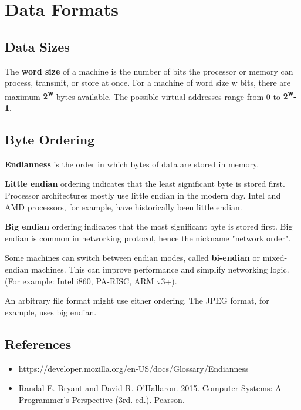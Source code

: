 \chapter{Data Formats}

\section{Data Sizes}
The \textbf{word size} of a machine is the number of bits the processor or memory can process, transmit, or store at once. For a machine of word size w bits, there are maximum \textbf{2\textsuperscript{w}} bytes available. The possible virtual addresses range from 0 to \textbf{2\textsuperscript{w}-1}.


\section{Byte Ordering}

\textbf{Endianness} is the order in which bytes of data are stored in memory.

\textbf{Little endian} ordering indicates that the least significant byte is stored first. Processor architectures mostly use little endian in the modern day. Intel and AMD processors, for example, have historically been little endian.

\textbf{Big endian} ordering indicates that the most significant byte is stored first. Big endian is common in networking protocol, hence the nickname "network order".

Some machines can switch between endian modes, called \textbf{bi-endian} or {mixed-endian} machines. This can improve performance and simplify networking logic. (For example: Intel i860, PA-RISC, ARM v3+).

An arbitrary file format might use either ordering. The JPEG format, for example, uses big endian.

\section{References}

\begin{itemize}
	\item https://developer.mozilla.org/en-US/docs/Glossary/Endianness
	\item Randal E. Bryant and David R. O'Hallaron. 2015. Computer Systems: A Programmer's Perspective (3rd. ed.). Pearson.
\end{itemize}